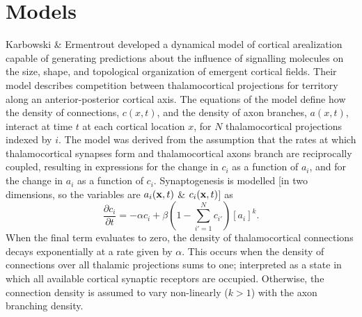 \documentclass[9pt,twocolumn,twoside,lineno]{pnas-new}
\begin{document}
\section*{Models}

Karbowski \& Ermentrout \citep{karbowski_model_2004} developed a dynamical
model of cortical arealization capable of generating predictions about the
influence of signalling molecules on the size, shape, and topological
organization of emergent cortical fields. Their model describes competition
between thalamocortical projections for territory along an anterior-posterior
cortical axis. The equations of the model define how the density of
connections, $c(x,t)$, and the density of axon branches, $a(x,t)$, interact at time $t$
at each cortical location $x$, for $N$ thalamocortical projections indexed by
$i$.
%
The model was derived from the assumption that the rates at which
thalamocortical synapses form and thalamocortical axons branch are
reciprocally coupled, resulting in expressions for the change in $c_i$ as a
function of $a_i$, and for the change in $a_i$ as a function of
$c_i$. Synaptogenesis is modelled [in two dimensions, so the variables are
$a_i(\mathbf{x},t)$ \& $c_i(\mathbf{x},t)$] as
%
\begin{equation} \label{eq:dc}
\frac{\partial c_i}{\partial t} =-\alpha c_i +\beta  \left(1 - \sum_{i'=1}^{N} c_{i'}\right)[a_i]^k.
\end{equation}
%
When the final term evaluates to zero, the density of thalamocortical
connections decays exponentially at a rate given by $\alpha$. This occurs when
the density of connections over all thalamic projections sums to one;
interpreted as a state in which all available cortical synaptic receptors are
occupied. Otherwise, the connection density is assumed to vary non-linearly
($k>1$) with the axon branching density.
\end{document}
